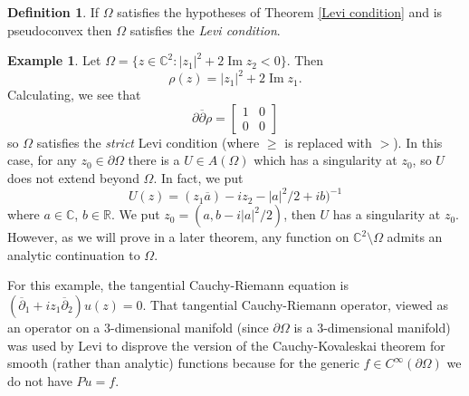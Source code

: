 \documentclass[12pt]{report}
\newcommand{\RR}{\mathbb{R}}
\newcommand{\CC}{\mathbb{C}}
\newcommand{\dbar}{\overline \partial}
\renewcommand{\Im}{\operatorname{Im}}
\newcommand{\dfn}[1]{\emph{#1}\index{#1}}
\theoremstyle{definition}
\newtheorem{definition}[theorem]{Definition}
\newtheorem{example}[theorem]{Example}
\begin{document}
\begin{definition}
    If $\Omega$ satisfies the hypotheses of Theorem \ref{Levi condition} and is pseudoconvex then $\Omega$ satisfies the \dfn{Levi condition}.
\end{definition}
\begin{example}
    Let $\Omega = \{z \in \CC^2: |z_1|^2 + 2 \Im z_2 < 0\}$. Then
    $$\rho(z) = |z_1|^2 + 2 \Im z_1.$$
    Calculating, we see that $$\partial\dbar \rho = \begin{bmatrix}1&0\\0&0\end{bmatrix}$$
    so $\Omega$ satisfies the \emph{strict} Levi condition (where $\geq$ is replaced with $>$). In this case, for any $z_0 \in \partial \Omega$ there is a $U \in A(\Omega)$ which has a singularity at $z_0$, so $U$ does not extend beyond $\Omega$. In fact, we put
    $$U(z) = (z_1\overline a) - iz_2 - |a|^2/2 + ib)^{-1}$$
    where $a \in \CC$, $b \in \RR$. We put $z_0 = (a, b -i|a|^2/2)$, then $U$ has a singularity at $z_0$. However, as we will prove in a later theorem, any function on $\CC^2 \setminus \Omega$ admits an analytic continuation to $\Omega$.

    For this example, the tangential Cauchy-Riemann equation is $(\dbar_1 + iz_1\dbar_2)u(z) = 0$. That tangential Cauchy-Riemann operator, viewed as an operator on a $3$-dimensional manifold (since $\partial \Omega$ is a $3$-dimensional manifold) was used by Levi to disprove the version of the Cauchy-Kovaleskai theorem for smooth (rather than analytic) functions because for the generic $f \in C^\infty(\partial \Omega)$ we do not have $Pu = f$.
\end{example}
\end{document}
